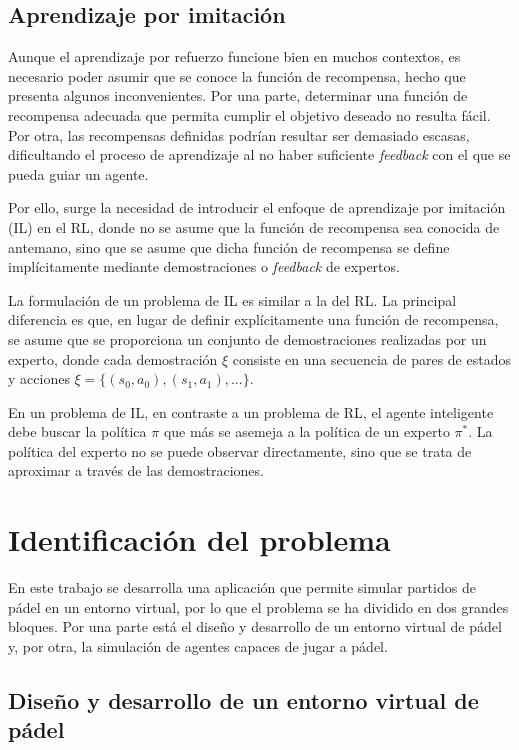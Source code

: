 \subsection{Aprendizaje por imitación}

Aunque el aprendizaje por refuerzo funcione bien en muchos contextos, es necesario poder asumir que se conoce la función de recompensa, hecho que presenta algunos inconvenientes. Por una parte, determinar una función de recompensa adecuada que permita cumplir el objetivo deseado no resulta fácil. Por otra, las recompensas definidas podrían resultar ser demasiado escasas, dificultando el proceso de aprendizaje al no haber suficiente \emph{feedback} con el que se pueda guiar un agente.

Por ello, surge la necesidad de introducir el enfoque de aprendizaje por imitación (IL) en el RL, donde no se asume que la función de recompensa sea conocida de antemano, sino que se asume que dicha función de recompensa se define implícitamente mediante demostraciones o \emph{feedback} de expertos.

La formulación de un problema de IL es similar a la del RL. La principal diferencia es que, en lugar de definir explícitamente una función de recompensa, se asume que se proporciona un conjunto de demostraciones realizadas por un experto, donde cada demostración  $\xi$ consiste en una secuencia de pares de estados y acciones $\xi=\{(s_0, a_0), (s_1, a_1), ...\}$.

En un problema de IL, en contraste a un problema de RL, el agente inteligente debe buscar la política $\pi$ que más se asemeja a la política de un experto $\pi^*$. La política del experto no se puede observar directamente, sino que se trata de aproximar a través de las demostraciones.

\section{Identificación del problema}

En este trabajo se desarrolla una aplicación que permite simular partidos de pádel en un entorno virtual, por lo que el problema se ha dividido en dos grandes bloques. Por una parte está el diseño y desarrollo de un entorno virtual de pádel y, por otra, la simulación de agentes capaces de jugar a pádel.

\subsection{Diseño y desarrollo de un entorno virtual de pádel}

